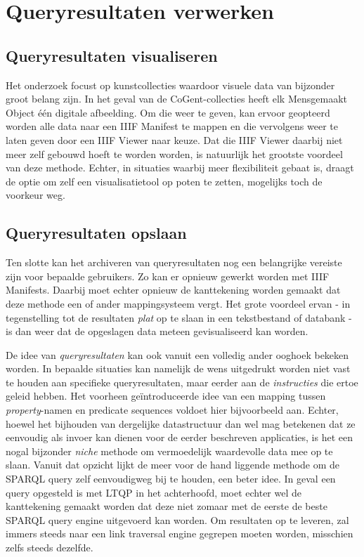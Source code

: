\documentclass[conference]{IEEEtran}
\begin{document}
\section{Queryresultaten verwerken}

\subsection{Queryresultaten visualiseren}
Het onderzoek focust op kunstcollecties waardoor visuele data van bijzonder groot belang zijn. In het geval van de CoGent-collecties heeft elk Mensgemaakt Object één digitale afbeelding. Om die weer te geven, kan ervoor geopteerd worden alle data naar een IIIF Manifest te mappen en die vervolgens weer te laten geven door een IIIF Viewer naar keuze. Dat die IIIF Viewer daarbij niet meer zelf gebouwd hoeft te worden worden, is natuurlijk het grootste voordeel van deze methode. Echter, in situaties waarbij meer flexibiliteit gebaat is, draagt de optie om zelf een visualisatietool op poten te zetten, mogelijks toch de voorkeur weg.

\subsection{Queryresultaten opslaan}
Ten slotte kan het archiveren van queryresultaten nog een belangrijke vereiste zijn voor bepaalde gebruikers. Zo kan er opnieuw gewerkt worden met IIIF Manifests. Daarbij moet echter opnieuw de kanttekening worden gemaakt dat deze methode een of ander mappingsysteem vergt. Het grote voordeel ervan - in tegenstelling tot de resultaten \textit{plat} op te slaan in een tekstbestand of databank - is dan weer dat de opgeslagen data meteen gevisualiseerd kan worden.

De idee van \textit{queryresultaten} kan ook vanuit een volledig ander ooghoek bekeken worden. In bepaalde situaties kan namelijk de wens uitgedrukt worden niet vast te houden aan specifieke queryresultaten, maar eerder aan de \textit{instructies} die ertoe geleid hebben. Het voorheen geïntroduceerde idee van een mapping tussen \textit{property}-namen en predicate sequences voldoet hier bijvoorbeeld aan. Echter, hoewel het bijhouden van dergelijke datastructuur dan wel mag betekenen dat ze eenvoudig als invoer kan dienen voor de eerder beschreven applicaties, is het een nogal bijzonder \textit{niche} methode om vermoedelijk waardevolle data mee op te slaan. Vanuit dat opzicht lijkt de meer voor de hand liggende methode om de SPARQL query zelf eenvoudigweg bij te houden, een beter idee. In geval een query opgesteld is met LTQP in het achterhoofd, moet echter wel de kanttekening gemaakt worden dat deze niet zomaar met de eerste de beste SPARQL query engine uitgevoerd kan worden. Om resultaten op te leveren, zal immers steeds naar een link traversal engine gegrepen moeten worden, misschien zelfs steeds dezelfde.
\end{document}
